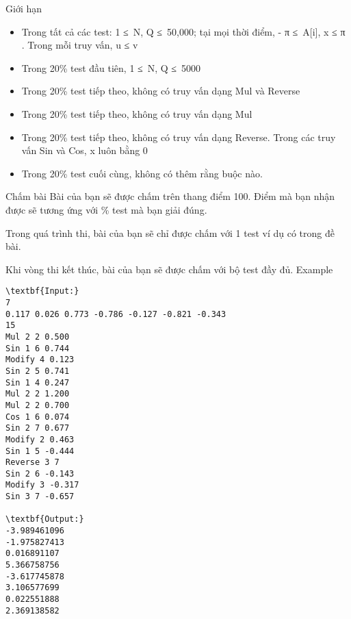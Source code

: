 Giới hạn
\begin{itemize}
	\item     Trong tất cả các test: 1 ≤ N, Q ≤ 50,000; tại mọi thời điểm, -         π        ≤ A[i], x ≤         π        . Trong mỗi truy vấn, u ≤ v   
	\item     Trong 20\% test đầu tiên, 1 ≤ N, Q ≤ 5000   
	\item     Trong 20\% test tiếp theo, không có truy vấn dạng Mul và Reverse   
	\item     Trong 20\% test tiếp theo, không có truy vấn dạng Mul   
	\item     Trong 20\% test tiếp theo, không có truy vấn dạng Reverse. Trong các truy vấn Sin và Cos, x luôn bằng 0   
	\item     Trong 20\% test cuối cùng, không có thêm rằng buộc nào.   
\end{itemize}
Chấm bài
Bài của bạn sẽ được chấm trên thang điểm 100. Điểm mà bạn nhận được sẽ tương ứng với \% test mà bạn giải đúng.  

   Trong quá trình thi, bài của bạn sẽ chỉ được chấm với 1 test ví dụ có trong đề bài.  

   Khi vòng thi kết thúc, bài của bạn sẽ được chấm với bộ test đầy đủ.
Example
\begin{verbatim}
\textbf{Input:}
7
0.117 0.026 0.773 -0.786 -0.127 -0.821 -0.343
15
Mul 2 2 0.500
Sin 1 6 0.744
Modify 4 0.123
Sin 2 5 0.741
Sin 1 4 0.247
Mul 2 2 1.200
Mul 2 2 0.700
Cos 1 6 0.074
Sin 2 7 0.677
Modify 2 0.463
Sin 1 5 -0.444
Reverse 3 7
Sin 2 6 -0.143
Modify 3 -0.317
Sin 3 7 -0.657

\textbf{Output:}
-3.989461096
-1.975827413
0.016891107
5.366758756
-3.617745878
3.106577699
0.022551888
2.369138582
\end{verbatim}